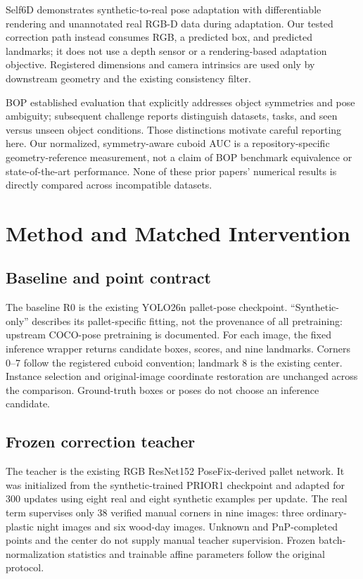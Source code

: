 \documentclass[journal]{IEEEtran}
\begin{document}
Self6D demonstrates synthetic-to-real pose adaptation with differentiable rendering and unannotated real RGB-D data during adaptation\cite{self6d}. Our tested correction path instead consumes RGB, a predicted box, and predicted landmarks; it does not use a depth sensor or a rendering-based adaptation objective. Registered dimensions and camera intrinsics are used only by downstream geometry and the existing consistency filter.

BOP established evaluation that explicitly addresses object symmetries and pose ambiguity\cite{bop}; subsequent challenge reports distinguish datasets, tasks, and seen versus unseen object conditions\cite{bop2024}. Those distinctions motivate careful reporting here. Our normalized, symmetry-aware cuboid AUC is a repository-specific geometry-reference measurement, not a claim of BOP benchmark equivalence or state-of-the-art performance. None of these prior papers' numerical results is directly compared across incompatible datasets.

\section{Method and Matched Intervention}
\subsection{Baseline and point contract}
The baseline R0 is the existing YOLO26n pallet-pose checkpoint. ``Synthetic-only'' describes its pallet-specific fitting, not the provenance of all pretraining: upstream COCO-pose pretraining is documented. For each image, the fixed inference wrapper returns candidate boxes, scores, and nine landmarks. Corners 0--7 follow the registered cuboid convention; landmark 8 is the existing center. Instance selection and original-image coordinate restoration are unchanged across the comparison. Ground-truth boxes or poses do not choose an inference candidate.

\subsection{Frozen correction teacher}
The teacher is the existing RGB ResNet152 PoseFix-derived pallet network. It was initialized from the synthetic-trained PRIOR1 checkpoint and adapted for 300 updates using eight real and eight synthetic examples per update. The real term supervises only 38 verified manual corners in nine images: three ordinary-plastic night images and six wood-day images. Unknown and PnP-completed points and the center do not supply manual teacher supervision. Frozen batch-normalization statistics and trainable affine parameters follow the original protocol.
\end{document}

